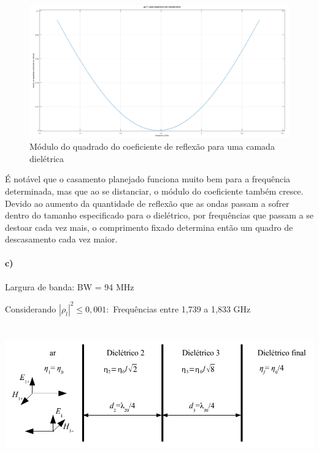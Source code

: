 \documentclass[12pt,a4paper]{article}
\begin{document}
\begin{center}
    \begin{figure}[h]
    \hspace{-25pt}
    \includegraphics[width=1.1\textwidth]{single.png}

    \caption{Módulo do quadrado do coeficiente de reflexão para uma camada dielétrica}
    \label{fig:awesome_image}
    
    \end{figure}
\end{center}

\vspace{-1cm}

É notável que o casamento planejado funciona muito bem para a frequência determinada, mas que ao se distanciar, o módulo do coeficiente também cresce. Devido ao aumento da quantidade de reflexão que as ondas passam a sofrer dentro do tamanho especificado para o dielétrico, por frequências que passam a se destoar cada vez mais, o comprimento fixado determina então um quadro de descasamento cada vez maior.

\paragraph{c)}

Largura de banda: BW = 94 MHz

Considerando $|\rho_l|^2 \le 0,001:$ Frequências entre 1,739 a 1,833 GHz

\newpage
\section{}

\begin{center}
    \includegraphics[scale=0.6]{q2.png}
\end{center}
\end{document}
